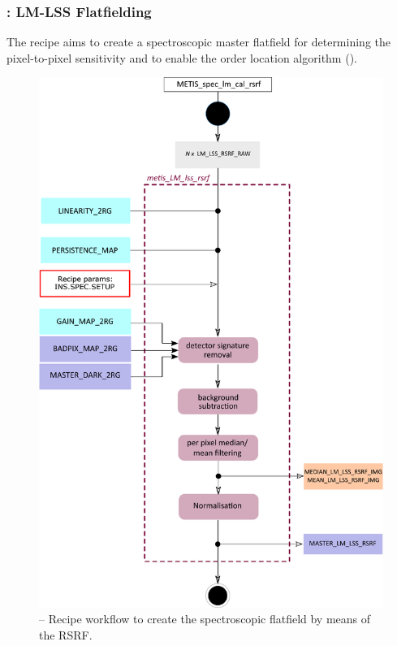 \subsubsection{: LM-LSS Flatfielding}\label{rec:metis_lm_lss_rsrf}
The recipe \hyperref[rec:metis_lm_lss_rsrf]{} aims to create a spectroscopic master flatfield for determining the pixel-to-pixel sensitivity and to enable the order location algorithm (\hyperref[rec:metis_lm_lss_trace]{}).
\begin{figure}[ht]
  \centering
  \includegraphics[width=0.5\textheight]{figures/metis_lm_lss_rsrf_v0.83.pdf}
  \caption[Recipe: ]{ --
    Recipe workflow to create the spectroscopic flatfield by means of the \ac{RSRF}.}
  \label{Fig:rec_lm_lss_rsrf}
\end{figure}

